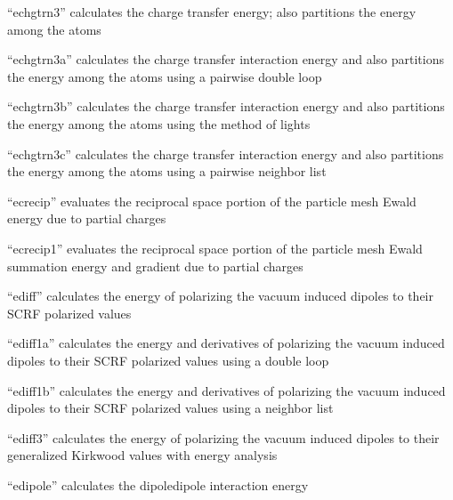 \documentclass[letterpaper,11pt,english]{sphinxmanual}
\begin{document}

“echgtrn3” calculates the charge transfer energy; also partitions
the energy among the atoms


“echgtrn3a” calculates the charge transfer interaction energy
and also partitions the energy among the atoms using a pairwise
double loop


“echgtrn3b” calculates the charge transfer interaction energy
and also partitions the energy among the atoms using the method
of lights


“echgtrn3c” calculates the charge transfer interaction energy
and also partitions the energy among the atoms using a pairwise
neighbor list


“ecrecip” evaluates the reciprocal space portion of the particle
mesh Ewald energy due to partial charges


“ecrecip1” evaluates the reciprocal space portion of the particle
mesh Ewald summation energy and gradient due to partial charges


“ediff” calculates the energy of polarizing the vacuum induced
dipoles to their SCRF polarized values


“ediff1a” calculates the energy and derivatives of polarizing
the vacuum induced dipoles to their SCRF polarized values using
a double loop


“ediff1b” calculates the energy and derivatives of polarizing
the vacuum induced dipoles to their SCRF polarized values using
a neighbor list


“ediff3” calculates the energy of polarizing the vacuum induced
dipoles to their generalized Kirkwood values with energy analysis


“edipole” calculates the dipole\sphinxhyphen{}dipole interaction energy
\end{document}

